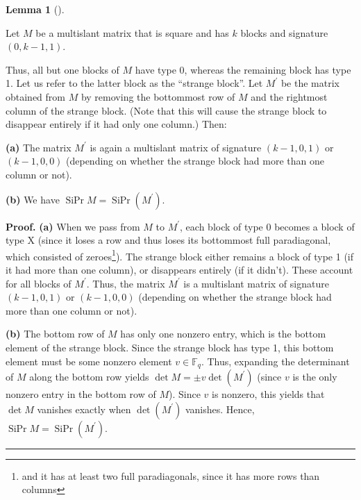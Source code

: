 \documentclass[numbers=enddot,12pt,final,onecolumn,notitlepage]{scrartcl}%
\theoremstyle{definition}
\newtheorem{lem}[theo]{Lemma}
\newenvironment{lemma}[1][]
{\begin{lem}[#1]\begin{leftbar}}
{\end{leftbar}\end{lem}}
\newenvironment{proof}[1][Proof]{\noindent\textbf{#1.} }{\ \rule{0.5em}{0.5em}}
\newcommand{\Fq}{\mathbb{F}_q}
\theoremstyle{plainsl}
\begin{document}
\begin{lemma}
\label{lem.multislant.red01}Let $M$ be a multislant matrix that is square and
has $k$ blocks and signature $\left(  0,k-1,1\right)  $.

Thus, all but one blocks of $M$ have type 0, whereas the remaining block has
type 1. Let us refer to the latter block as the ``strange block''. Let
$M^{\prime}$ be the matrix obtained from $M$ by removing the bottommost row of
$M$ and the rightmost column of the strange block. (Note that this will cause
the strange block to disappear entirely if it had only one column.) Then:

\textbf{(a)} The matrix $M^{\prime}$ is again a multislant matrix of signature
$\left(  k-1,0,1\right)  $ or $\left(  k-1,0,0\right)  $ (depending on whether
the strange block had more than one column or not).

\textbf{(b)} We have $\operatorname*{SiPr}M=\operatorname*{SiPr}\left(
M^{\prime}\right)  $.
\end{lemma}

\begin{proof}
\textbf{(a)} When we pass from $M$ to $M^{\prime}$, each block of type 0
becomes a block of type X (since it loses a row and thus loses its bottommost
full paradiagonal, which consisted of zeroes\footnote{and it has at least two
full paradiagonals, since it has more rows than columns}).
The strange block either
remains a block of type 1 (if it had more than one column), or disappears
entirely (if it didn't). These account for all blocks of $M^{\prime}$. Thus,
the matrix $M^{\prime}$ is a multislant matrix of signature $\left(
k-1,0,1\right)  $ or $\left(  k-1,0,0\right)  $ (depending on whether the
strange block had more than one column or not). \medskip

\textbf{(b)} The bottom row of $M$ has only one nonzero entry, which is the
bottom element of the strange block. Since the strange block has type 1, this
bottom element must be some nonzero element $v\in\Fq$. Thus,
expanding the determinant of $M$ along the bottom row yields $\det M=\pm
v\det\left(  M^{\prime}\right)  $ (since $v$ is the only nonzero entry in the
bottom row of $M$). Since $v$ is nonzero, this yields that $\det M$ vanishes
exactly when $\det\left(  M^{\prime}\right)  $ vanishes. Hence,
$\operatorname*{SiPr}M=\operatorname*{SiPr}\left(  M^{\prime}\right)  $.
\end{proof}
\end{document}
